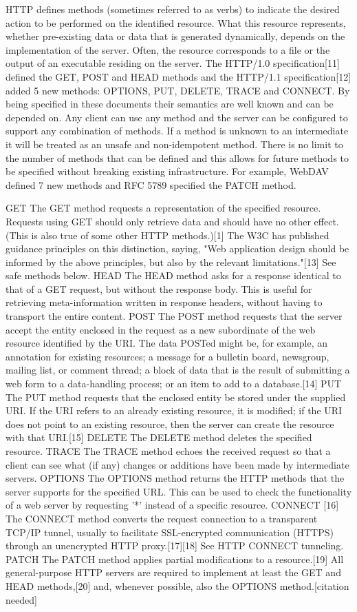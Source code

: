 \documentclass[12pt,a4paper,titlepage,openany]{report}
\begin{document}
   HTTP defines methods (sometimes referred to as verbs) to indicate the desired action to be performed on the identified resource. What this resource represents, whether pre-existing data or data that is generated dynamically, depends on the implementation of the server. Often, the resource corresponds to a file or the output of an executable residing on the server. The HTTP/1.0 specification[11] defined the GET, POST and HEAD methods and the HTTP/1.1 specification[12] added 5 new methods: OPTIONS, PUT, DELETE, TRACE and CONNECT. By being specified in these documents their semantics are well known and can be depended on. Any client can use any method and the server can be configured to support any combination of methods. If a method is unknown to an intermediate it will be treated as an unsafe and non-idempotent method. There is no limit to the number of methods that can be defined and this allows for future methods to be specified without breaking existing infrastructure. For example, WebDAV defined 7 new methods and RFC 5789 specified the PATCH method.


GET
The GET method requests a representation of the specified resource. Requests using GET should only retrieve data and should have no other effect. (This is also true of some other HTTP methods.)[1] The W3C has published guidance principles on this distinction, saying, "Web application design should be informed by the above principles, but also by the relevant limitations."[13] See safe methods below.
HEAD
The HEAD method asks for a response identical to that of a GET request, but without the response body. This is useful for retrieving meta-information written in response headers, without having to transport the entire content.
POST
The POST method requests that the server accept the entity enclosed in the request as a new subordinate of the web resource identified by the URI. The data POSTed might be, for example, an annotation for existing resources; a message for a bulletin board, newsgroup, mailing list, or comment thread; a block of data that is the result of submitting a web form to a data-handling process; or an item to add to a database.[14]
PUT
The PUT method requests that the enclosed entity be stored under the supplied URI. If the URI refers to an already existing resource, it is modified; if the URI does not point to an existing resource, then the server can create the resource with that URI.[15]
DELETE
The DELETE method deletes the specified resource.
TRACE
The TRACE method echoes the received request so that a client can see what (if any) changes or additions have been made by intermediate servers.
OPTIONS
The OPTIONS method returns the HTTP methods that the server supports for the specified URL. This can be used to check the functionality of a web server by requesting '*' instead of a specific resource.
CONNECT
[16] The CONNECT method converts the request connection to a transparent TCP/IP tunnel, usually to facilitate SSL-encrypted communication (HTTPS) through an unencrypted HTTP proxy.[17][18] See HTTP CONNECT tunneling.
PATCH
The PATCH method applies partial modifications to a resource.[19]
All general-purpose HTTP servers are required to implement at least the GET and HEAD methods,[20] and, whenever possible, also the OPTIONS method.[citation needed]
\end{document}
